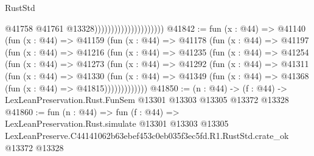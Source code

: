 \begin{lexlean}{RustStd}
\begin{coremodule}
                                              @41758
                                              @41761
                                              @13328)))))))))))))))))))))
@41842 := fun (x : @44) =>
  @41140
    (fun (x : @44) =>
    @41159
      (fun (x : @44) =>
      @41178
        (fun (x : @44) =>
        @41197
          (fun (x : @44) =>
          @41216
            (fun (x : @44) =>
            @41235
              (fun (x : @44) =>
              @41254
                (fun (x : @44) =>
                @41273
                  (fun (x : @44) =>
                  @41292
                    (fun (x : @44) =>
                    @41311
                      (fun (x : @44) =>
                      @41330
                        (fun (x : @44) =>
                        @41349 (fun (x : @44) => @41368 (fun (x : @44) => @41815)))))))))))))
@41850 := (n : @44) ->
  (f : @44) -> LexLeanPreservation.Rust.FunSem @13301 @13303 @13305 @13372 @13328
@41860 := fun (n : @44) =>
  fun (f : @44) =>
  LexLeanPreservation.Rust.simulate
    @13301
    @13303
    @13305
    LexLeanPreserve.C44141062b63ebef453c0eb035f3ec5fd.R1.RustStd.crate_ok
    @13372
    @13328
\end{coremodule}
\end{lexlean}
